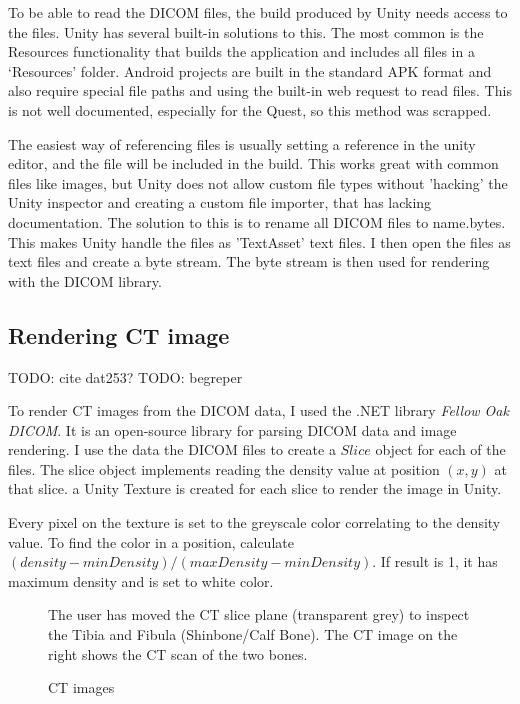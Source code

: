 \documentclass[a4paper]{report}
\begin{document}
To be able to read the DICOM files, the build produced by Unity needs access to the files. Unity has several built-in solutions to this.
The most common is the Resources functionality\cite{resourcesload_unity_nodate} that builds the application and includes all files in a `Resources' folder. Android projects are built in the standard APK format and also require special file paths and using the built-in web request to read files. This is not well documented, especially for the Quest, so this method was scrapped.

The easiest way of referencing files is usually setting a reference in the unity editor, and the file will be included in the build. This works great with common files like images, but Unity does not allow custom file types without 'hacking' the Unity inspector and creating a custom file importer\cite{scriptedimporters_unity_nodate}, that has lacking documentation. The solution to this is to rename all DICOM files to {name}.bytes. This makes Unity handle the files as 'TextAsset' text files\cite{textassets_unity_nodate}. I then open the files as text files and create a byte stream. The byte stream is then used for rendering with the DICOM library.

\subsection{Rendering CT image}
TODO: cite dat253?
TODO: begreper

To render CT images from the DICOM data, I used the .NET library \emph{Fellow Oak DICOM}\cite{noauthor_fellow_2022}. It is an open-source library for parsing DICOM data and image rendering.
I use the data the DICOM files to create a $Slice$ object for each of the files. The slice object implements reading the density value at position $(x, y)$ at that slice. a Unity Texture is created for each slice to render the image in Unity.

Every pixel on the texture is set to the greyscale color correlating to the density value. To find the color in a position, calculate $(density-minDensity)/(maxDensity-minDensity)$. If result is 1, it has maximum density and is set to white color.

\begin{figure}[h!]
    \centering
	\hfill
  \caption{CT images}
  \small
  The user has moved the CT slice plane (transparent grey) to inspect the Tibia and Fibula (Shinbone/Calf Bone). The CT image on the right shows the CT scan of the two bones.
~\cite{mishra_virtual_2019}
\end{figure}
\end{document}
